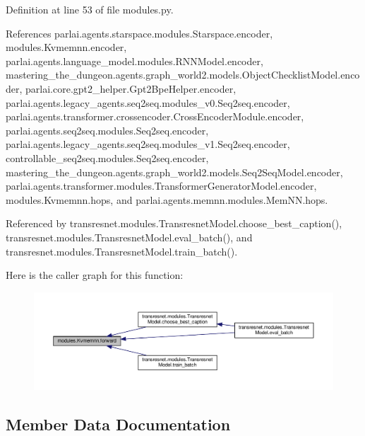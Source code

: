 Definition at line 53 of file modules.\+py.



References parlai.\+agents.\+starspace.\+modules.\+Starspace.\+encoder, modules.\+Kvmemnn.\+encoder, parlai.\+agents.\+language\+\_\+model.\+modules.\+R\+N\+N\+Model.\+encoder, mastering\+\_\+the\+\_\+dungeon.\+agents.\+graph\+\_\+world2.\+models.\+Object\+Checklist\+Model.\+encoder, parlai.\+core.\+gpt2\+\_\+helper.\+Gpt2\+Bpe\+Helper.\+encoder, parlai.\+agents.\+legacy\+\_\+agents.\+seq2seq.\+modules\+\_\+v0.\+Seq2seq.\+encoder, parlai.\+agents.\+transformer.\+crossencoder.\+Cross\+Encoder\+Module.\+encoder, parlai.\+agents.\+seq2seq.\+modules.\+Seq2seq.\+encoder, parlai.\+agents.\+legacy\+\_\+agents.\+seq2seq.\+modules\+\_\+v1.\+Seq2seq.\+encoder, controllable\+\_\+seq2seq.\+modules.\+Seq2seq.\+encoder, mastering\+\_\+the\+\_\+dungeon.\+agents.\+graph\+\_\+world2.\+models.\+Seq2\+Seq\+Model.\+encoder, parlai.\+agents.\+transformer.\+modules.\+Transformer\+Generator\+Model.\+encoder, modules.\+Kvmemnn.\+hops, and parlai.\+agents.\+memnn.\+modules.\+Mem\+N\+N.\+hops.



Referenced by transresnet.\+modules.\+Transresnet\+Model.\+choose\+\_\+best\+\_\+caption(), transresnet.\+modules.\+Transresnet\+Model.\+eval\+\_\+batch(), and transresnet.\+modules.\+Transresnet\+Model.\+train\+\_\+batch().

Here is the caller graph for this function\+:
\nopagebreak
\begin{figure}[H]
\begin{center}
\leavevmode
\includegraphics[width=350pt]{classmodules_1_1Kvmemnn_a85a9be2539bc746cfb162d450067c551_icgraph}
\end{center}
\end{figure}


\subsection{Member Data Documentation}
\mbox{\label{classmodules_1_1Kvmemnn_a0506fd88e99167de46b9282f24fc0d80}} 
